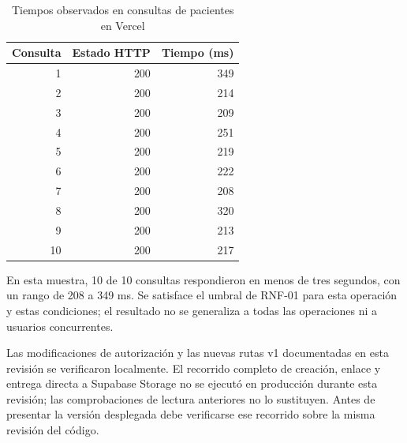 \begin{table}[H]\centering
\caption{Tiempos observados en consultas de pacientes en Vercel}
\begin{tabular}{rrr}\toprule
\textbf{Consulta}&\textbf{Estado HTTP}&\textbf{Tiempo (ms)}\\\midrule
1&200&349\\
2&200&214\\
3&200&209\\
4&200&251\\
5&200&219\\
6&200&222\\
7&200&208\\
8&200&320\\
9&200&213\\
10&200&217\\
\bottomrule\end{tabular}\end{table}
En esta muestra, 10 de 10 consultas respondieron en menos de tres
segundos, con un rango de 208 a 349 ms.
Se satisface el umbral de RNF-01 para esta operación y estas condiciones;
el resultado no se generaliza a todas las operaciones ni a usuarios concurrentes.

Las modificaciones de autorización y las nuevas rutas v1 documentadas en esta
revisión se verificaron localmente. El recorrido completo de creación,
enlace y entrega directa a Supabase Storage no se ejecutó en producción
durante esta revisión; las comprobaciones de lectura anteriores no lo
sustituyen. Antes de presentar la versión desplegada debe verificarse ese
recorrido sobre la misma revisión del código.
